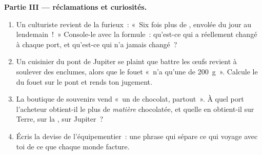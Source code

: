 \begin{problem}
\medskip\noindent\textbf{Partie III --- réclamations et
curiosités.}
\begin{enumerate}[resume]
  \item Un culturiste revient de la  furieux~: «~Six fois plus
        de , envolée du jour au lendemain~!~» Console-le avec
        la formule~: qu'est-ce qui a réellement changé à chaque
        port, et qu'est-ce qui n'a jamais changé~?
  \item Un cuisinier du pont de Jupiter se plaint que battre les
        œufs revient à soulever des enclumes, alors que le fouet
        «~n'a qu'une  de \qty{200}{g}~». Calcule le  du
        fouet sur le pont et rends ton jugement.
  \item La boutique de souvenirs vend «~un  de chocolat,
        partout~». À quel port l'acheteur obtient-il le plus de
        \emph{matière} chocolatée, et quelle  en obtient-il
        sur Terre, sur la , sur Jupiter~?
  \item Écris la devise de l'équipementier~: une phrase qui sépare
        ce qui voyage avec toi de ce que chaque monde facture.
\end{enumerate}
\end{problem}
